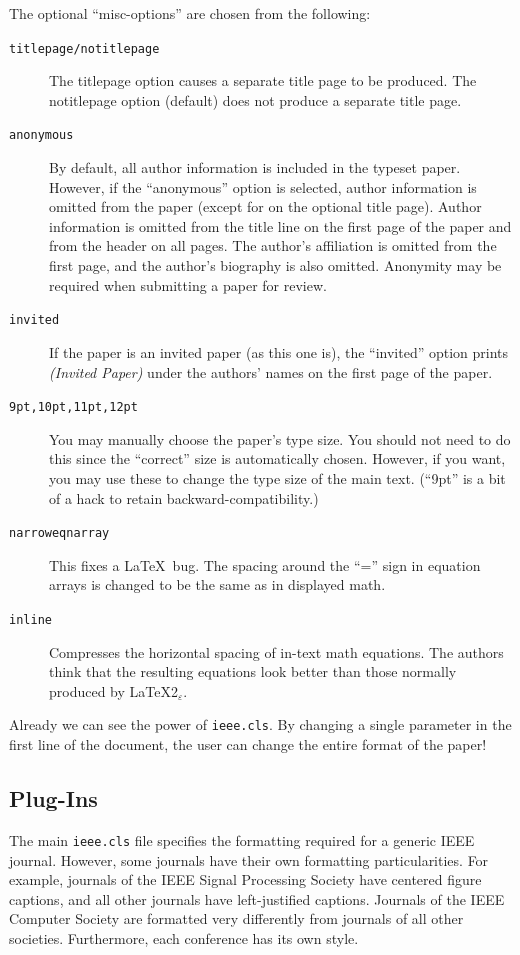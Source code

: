 \documentclass[%
	final,
	notitlepage,
	narroweqnarray,
	inline,
	twoside,
	]{ieee}
\newcommand{\latexiie}{\LaTeX2{\Large$_\varepsilon$}}
\begin{document}
The optional ``misc-options'' are chosen from the following:
\begin{description}
\item[\texttt{titlepage/notitlepage}] The titlepage option causes a
    separate title page to be produced. The notitlepage option 
    (default) does not produce a separate title page.
\item[\texttt{anonymous}] By default, all author information is included
    in the typeset paper.
    However, if the ``anonymous'' option is selected, author information
    is omitted from the paper (except for on the optional title page).
    Author information is omitted from the title line on the first
    page of the paper and from the header on all pages. The author's
    affiliation is omitted from the first page, and the author's 
    biography is also omitted. Anonymity may be required when
    submitting a paper for review.
\item[\texttt{invited}] If the paper is an invited paper (as this
    one is), the ``invited'' option prints \emph{(Invited Paper)} under the 
    authors' names on the first page of the paper.
\item[\texttt{9pt,10pt,11pt,12pt}] You may manually choose the paper's 
    type size.
    You should not need to do this since the ``correct'' size is
    automatically chosen. However, if you want, you may use these to
    change the type size of the main text. (``9pt'' is a bit of a hack
    to retain backward-compatibility.)
\item[\texttt{narroweqnarray}] This fixes a \LaTeX\ bug. The
    spacing around the ``='' sign in equation arrays is changed 
    to be the same as in displayed math.  
\item[\texttt{inline}] Compresses the horizontal spacing of in-text
    math equations. The authors think that the resulting equations
    look better than those normally produced by \latexiie.
\end{description}

Already we can see the power of \texttt{ieee.cls}. By changing a
single parameter in the first line of the document, the user can
change the entire format of the paper!

\subsection{Plug-Ins}

The main \texttt{ieee.cls} file specifies the formatting required for
a generic IEEE journal. However, some journals have their own
formatting particularities. For example, journals of the IEEE Signal
Processing Society have centered figure captions, and all other
journals have left-justified captions. Journals of the IEEE Computer
Society are formatted very differently from journals of all other
societies. Furthermore, each conference has its own style.
\end{document}
